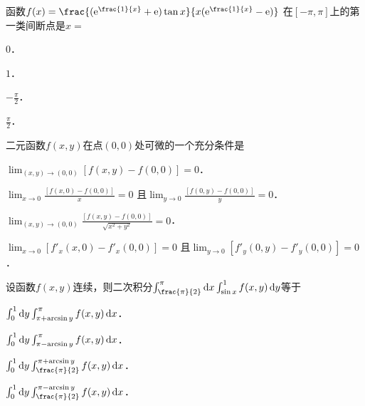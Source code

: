 \documentclass[plain,noanswer,medmath]{../../template/jnuexam}
\begin{document}








\begin{problem}
函数$f(x) = \frac{(\e^{\frac{1}{x}} + \e)\tan x}{x(\e^{\frac{1}{x}} - \e)}$
在$\left[- \pi ,\pi \right]$上的第一类间断点是$x =$\pickout{}
\begin{abcd}
\item $0$．
\item $1$．
\item $- \frac{\pi}{2}$．
\item $\frac{\pi}{2}$．
\end{abcd}
\end{problem}










\begin{problem}
二元函数$f(x,y)$在点$(0,0)$处可微的一个充分条件是\pickout{}
\begin{abcd}
\item $\lim_{(x,y) \to(0,0)} \left[f(x,y) - f(0,0) \right] = 0$．
\item $\lim_{x \to 0} \frac{\left[f(x,0) - f(0,0) \right]}{x} = 0$
      且$\lim_{y \to 0} \frac{\left[f(0,y) - f(0,0) \right]}{y} = 0$．
\item $\lim_{(x,y) \to(0,0)} \frac{\left[f(x,y) - f(0,0) \right]}{\sqrt{x^2 + y^2}} = 0$．
\item $\lim_{x \to 0} \left[f'_x(x,0) - f'_x(0,0) \right] = 0$
      且$\lim_{y \to 0} \left[f'_y(0,y) - f'_y(0,0) \right] = 0$．
\end{abcd}
\end{problem}


\begin{problem}
设函数$f(x,y)$连续，则二次积分$\int_{\frac{\pi}{2}}^{\pi}\dx\int_{\sin x}^1 f(x,y)\dy$等于\pickout{}
\begin{abcd}
\item $\int_0^1 \mathop{}\!\mathrm{d} y\int_{\pi + \arcsin y}^{\pi}f(x,y)\mathop{}\!\mathrm{d} x$．
\item $\int_0^1 \mathop{}\!\mathrm{d} y\int_{\pi - \arcsin y}^{\pi}f(x,y)\mathop{}\!\mathrm{d} x$．
\item $\int_0^1 \dy\int_{\frac{\pi}{2}}^{\pi + \arcsin y} f(x,y)\dx$．
\item $\int_0^1 \dy\int_{\frac{\pi}{2}}^{\pi - \arcsin y} f(x,y)\dx$．
\end{abcd}
\end{problem}
\end{document}
